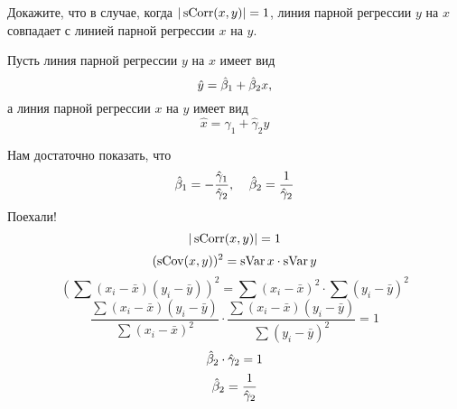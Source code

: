 \begin{problem}
Докажите, что в случае, когда $|\operatorname{sCorr}(x, y)| = 1$, линия парной регрессии $y$ на $x$ совпадает с линией парной регрессии $x$ на $y$.


\begin{sol}

Пусть линия парной регрессии \(y\) на \(x\) имеет вид
\[  \hat{y} = \hat{\beta}_1 + \hat{\beta}_2 x,\]
а линия парной регрессии \(x\) на \(y\) имеет вид
\[  \hat{x} = \hat{\gamma}_1 + \hat{\gamma}_2 y\]

Нам достаточно показать, что
\[\hat{\beta}_1 = - \frac{\hat{\gamma}_1}{\hat{\gamma}_2}, \:\:\:\:\: \hat{\beta}_2= \frac{1}{\hat{\gamma}_2} \]
Поехали!
\[ |\operatorname{sCorr}(x, y)| = 1 \]
\[ (\operatorname{sCov} (x, y))^2 = \operatorname{sVar} x \cdot \operatorname{sVar} y   \]
\[  \left(\sum(x_i - \bar{x})(y_i - \bar{y}) \right)^2 = \sum (x_i - \bar{x})^2 \cdot \sum (y_i - \bar{y})^2   \]
\[  \frac{\sum(x_i - \bar{x})(y_i - \bar{y})}{\sum (x_i - \bar{x})^2} \cdot \frac{\sum(x_i - \bar{x})(y_i - \bar{y})}{\sum (y_i - \bar{y})^2} = 1  \]
\[  \hat{\beta}_2 \cdot \hat{\gamma}_2 = 1  \]
\[ \hat{\beta}_2= \frac{1}{\hat{\gamma}_2}\]


\end{sol}
\end{problem}
